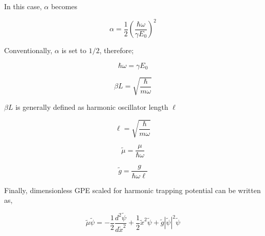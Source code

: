 \documentclass[a4paper,times,hidelinks,12pt]{article}
\begin{document}
In this case, $\alpha$ becomes

$$ \alpha =  \frac{1}{2} \left(\frac{\hbar \omega}{\gamma E_0}\right)^2 $$

Conventionally, $\alpha$ is set to $1/2$, therefore;

$$ \hbar \omega = \gamma E_0 $$

$$ \beta L = \sqrt{\frac{\hbar}{m\omega}} $$ 

$ \beta L $ is generally defined as harmonic oscillator length $\ell$

$$ \ell = \sqrt{\frac{\hbar}{m\omega}} $$ 

$$ \widetilde{\mu} = \frac{\mu}{\hbar \omega} $$ 

$$ \widetilde{g} = \frac{g}{\hbar \omega \ell} $$

Finally, dimensionless GPE scaled for harmonic trapping potential can be written as,

$$\widetilde{\mu} \widetilde{\psi} = -\frac{1}{2}\frac{d^2\widetilde{\psi}}{d\widetilde{x}^2} + \frac{1}{2}\widetilde{x}^2\widetilde{\psi} + \widetilde{g}|\widetilde{\psi}|^2 \widetilde{\psi} $$
\end{document}
